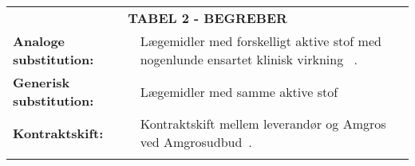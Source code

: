 \begin{table}[H]
\label{table:begreber}
\begin{tabular}{p{4.5cm} p{9.8cm}}
\multicolumn{2}{c}{\cellcolor[HTML]{C0C0C0}\textbf{TABEL 2 - BEGREBER}} \vspace{0.5cm}\\
\textbf{Analoge substitution:} & Lægemidler med forskelligt aktive stof med nogenlunde ensartet klinisk virkning~\citep{DanskSelskabforPatientsikkerhed2009} . \vspace{0.5cm} \\
\textbf{Generisk substitution:} & Lægemidler med samme aktive stof \vspace{0.5cm} \\
\textbf{Kontraktskift:} & Kontraktskift mellem leverandør og Amgros ved Amgrosudbud~\citep{DanskSelskabforPatientsikkerhed2009}.  \vspace{0.5cm} \\
 \vspace{0.5cm} \\

\end{tabular}
\end{table}
